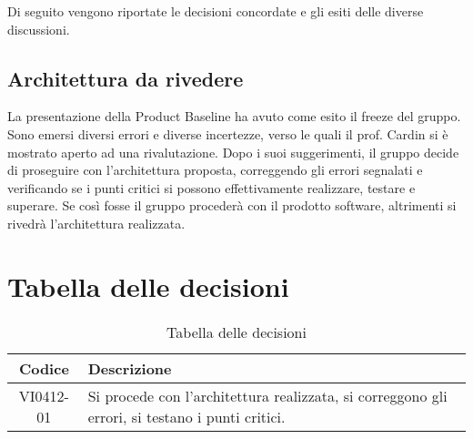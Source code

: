 \documentclass{article}
\begin{document}
Di seguito vengono riportate le decisioni concordate e gli esiti delle diverse discussioni.

\subsection{Architettura da rivedere}
\label{itm:1}

La presentazione della Product Baseline ha avuto come esito il freeze del gruppo. Sono emersi diversi errori e diverse incertezze,
verso le quali il prof. Cardin si è mostrato aperto ad una rivalutazione. Dopo i suoi suggerimenti, il gruppo decide di proseguire
con l'architettura proposta, correggendo gli errori segnalati e verificando se i punti critici si possono effettivamente realizzare,
testare e superare. Se così fosse il gruppo procederà con il prodotto software, altrimenti si rivedrà l'architettura realizzata.


\section{Tabella delle decisioni}%
\label{sub:decisioni}

\begin{table}[!ht]
	\centering
	\begin{tabular}{|c|p{13cm}|}
		\hline
		\rowcolor{lightgray}
		\textbf{Codice} & \textbf{Descrizione} \\
		\hline
			VI0412-01 & Si procede con l'architettura realizzata, si correggono gli errori, si testano i punti critici. \\
		\hline
	\end{tabular}
	\caption{Tabella delle decisioni}
\end{table}
\end{document}

